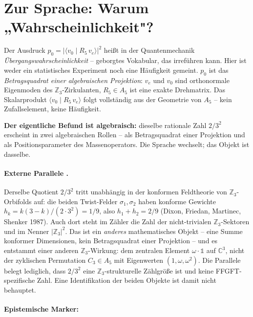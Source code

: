 \section*{Zur Sprache: Warum „Wahrscheinlichkeit"?}

Der Ausdruck $p_0 = |\langle v_0 \mid R_5\, v_e\rangle|^2$ heißt in der
Quantenmechanik \emph{Übergangswahrscheinlichkeit} -- geborgtes Vokabular,
das irreführen kann. Hier ist weder ein statistisches Experiment noch eine
Häufigkeit gemeint. $p_0$ ist das \emph{Betragsquadrat einer algebraischen
Projektion}: $v_e$ und $v_0$ sind orthonormale Eigenmoden des
$\mathbb{Z}_3$-Zirkulanten, $R_5\in A_5$ ist eine exakte Drehmatrix.
Das Skalarprodukt $\langle v_0\mid R_5\,v_e\rangle$ folgt vollständig
aus der Geometrie von $A_5$ -- kein Zufallselement, keine Häufigkeit.

\textbf{Der eigentliche Befund ist algebraisch:} dieselbe rationale Zahl
$2/3^2$ erscheint in zwei algebraischen Rollen -- als Betragsquadrat einer
Projektion und als Positionsparameter des Massenoperators.
Die Sprache wechselt; das Objekt ist dasselbe.

\paragraph{Externe Parallele \EM.}
Derselbe Quotient $2/3^2$ tritt unabhängig in der konformen Feldtheorie
von $\mathbb{Z}_3$-Orbifolds auf: die beiden Twist-Felder $\sigma_1,\sigma_2$
haben konforme Gewichte $h_k = k(3-k)/(2\cdot3^2) = 1/9$, also
$h_1+h_2 = 2/9$ (Dixon, Friedan, Martinec, Shenker 1987). Auch dort steht
im Zähler die Zahl der nicht-trivialen $\mathbb{Z}_3$-Sektoren und im Nenner
$|\mathbb{Z}_3|^2$. Das ist ein \emph{anderes} mathematisches Objekt --
eine Summe konformer Dimensionen, kein Betragsquadrat einer Projektion --
und es entstammt einer anderen $\mathbb{Z}_3$-Wirkung: dem zentralen
Element $\omega\cdot\mathbb{1}$ auf $\mathbb{C}^3$, nicht der zyklischen
Permutation $C_3\in A_5$ mit Eigenwerten $(1,\omega,\omega^2)$. Die
Parallele belegt lediglich, dass $2/3^2$ eine $\mathbb{Z}_3$-strukturelle
Zählgröße ist und keine FFGFT-spezifische Zahl. Eine Identifikation der
beiden Objekte ist damit nicht behauptet.



\paragraph*{Epistemische Marker:}\mbox{}\\[2pt]


